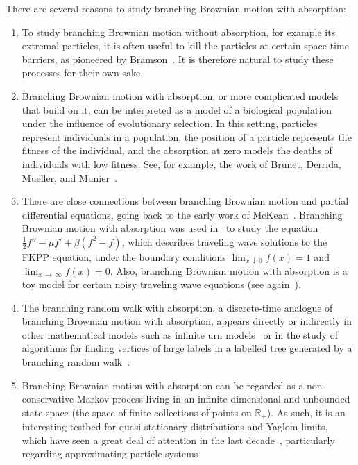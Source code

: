 \documentclass[10pt]{amsart}
\theoremstyle{definition}\newtheorem{defi}[theo]{Definition}\newtheorem{rema}[theo]{Remark}\newtheorem{exam}[theo]{Example}\newtheorem{exem}[theo]{Example}\newtheorem{nota}[theo]{Notation}
\newcommand*\R{\mathbb{R}}
\newcommand{\1} {\mathds{1}}
\begin{document}
There are several reasons to study branching Brownian motion with absorption:
\begin{enumerate}
\item To study branching Brownian motion without absorption, for example its extremal particles, it is often useful to kill the particles at certain space-time barriers, as pioneered by Bramson~\cite{Bramson1978}. It is therefore natural to study these processes for their own sake.

\item Branching Brownian motion with absorption, or more complicated models that build on it, can be interpreted as a model of a biological population under the influence of evolutionary selection. In this setting, particles represent individuals in a population, the position of a particle represents the fitness of the individual, and the absorption at zero models the deaths of individuals with low fitness. See, for example, the work of Brunet, Derrida, Mueller, and Munier~\cite{bdmm1, bdmm2}.

\item There are close connections between branching Brownian motion and partial differential equations, going back to the early work of McKean~\cite{mckean}. Branching Brownian motion with absorption was used in~\cite{hhk06} to study the equation $\frac{1}{2} f'' - \mu f' + \beta (f^2 - f)$, which describes traveling wave solutions to the FKPP equation, under the boundary conditions $\lim_{x\,\downarrow\,0} f(x) = 1$ and $\lim_{x\,\rightarrow\,\infty} f(x) = 0$. Also, branching Brownian motion with absorption is a toy model for certain noisy traveling wave equations (see again~\cite{bdmm1,bdmm2}).

\item The branching random walk with absorption, a discrete-time analogue of branching Brownian motion with absorption, appears directly or indirectly in other mathematical models such as infinite urn models~\cite{mr2016} or in the study of algorithms for finding vertices of large labels in a labelled tree generated by a branching random walk~\cite{Aldous1992}.

\item Branching Brownian motion with absorption can be regarded as a non-conservative Markov process living in an infinite-dimensional and unbounded state space (the space of finite collections of points on $\R_+$). As such, it is an interesting testbed for quasi-stationary distributions and Yaglom limits, which have seen a great deal of attention in the last decade~\cite{cclmms,cv16,mv12}, particularly regarding approximating particle systems~\cite{afgj,delmoral}
\end{enumerate}
\end{document}
